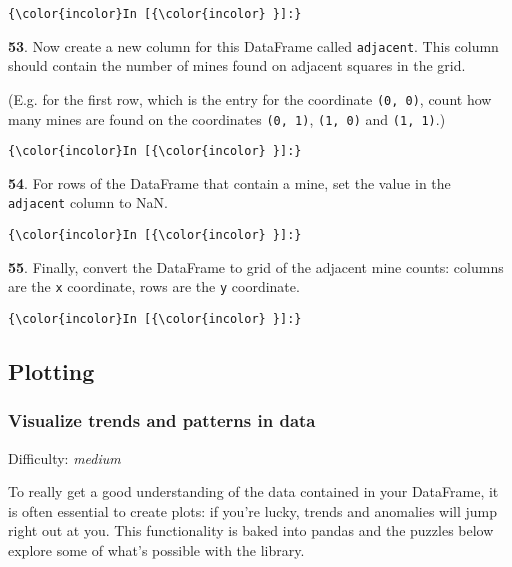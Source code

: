 \documentclass[11pt]{article}
\begin{document}
    \begin{Verbatim}[commandchars=\\\{\}]
{\color{incolor}In [{\color{incolor} }]:} 
\end{Verbatim}


    \textbf{53}. Now create a new column for this DataFrame called
\texttt{\textquotesingle{}adjacent\textquotesingle{}}. This column
should contain the number of mines found on adjacent squares in the
grid.

(E.g. for the first row, which is the entry for the coordinate
\texttt{(0,\ 0)}, count how many mines are found on the coordinates
\texttt{(0,\ 1)}, \texttt{(1,\ 0)} and \texttt{(1,\ 1)}.)

    \begin{Verbatim}[commandchars=\\\{\}]
{\color{incolor}In [{\color{incolor} }]:} 
\end{Verbatim}


    \textbf{54}. For rows of the DataFrame that contain a mine, set the
value in the \texttt{\textquotesingle{}adjacent\textquotesingle{}}
column to NaN.

    \begin{Verbatim}[commandchars=\\\{\}]
{\color{incolor}In [{\color{incolor} }]:} 
\end{Verbatim}


    \textbf{55}. Finally, convert the DataFrame to grid of the adjacent mine
counts: columns are the \texttt{x} coordinate, rows are the \texttt{y}
coordinate.

    \begin{Verbatim}[commandchars=\\\{\}]
{\color{incolor}In [{\color{incolor} }]:} 
\end{Verbatim}


    \subsection{Plotting}\label{plotting}

\subsubsection{Visualize trends and patterns in
data}\label{visualize-trends-and-patterns-in-data}

Difficulty: \emph{medium}

To really get a good understanding of the data contained in your
DataFrame, it is often essential to create plots: if you're lucky,
trends and anomalies will jump right out at you. This functionality is
baked into pandas and the puzzles below explore some of what's possible
with the library.
\end{document}
